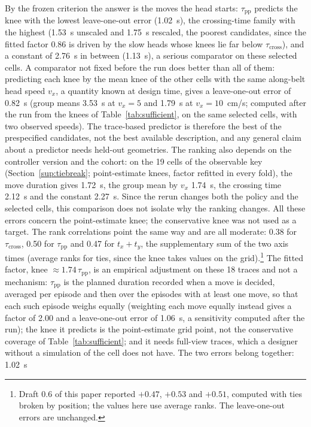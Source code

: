 \documentclass[11pt,a4paper]{article}
\newcommand{\tcross}{\tau_{\mathrm{cross}}}
\newcommand{\tpp}{\tau_{\mathrm{pp}}}
\begin{document}
By the frozen criterion the answer is the moves the head starts: $\tpp$ predicts the
knee with the lowest leave-one-out error (1.02~s), the crossing-time family with the
highest (1.53~s unscaled and 1.75~s rescaled, the poorest candidates, since the fitted
factor 0.86 is driven by the slow heads whose knees lie far below $\tcross$), and a
constant of 2.76~s in between (1.13~s), a serious comparator on these selected cells. A
comparator not fixed before the run does better than all of them: predicting each knee by
the mean knee of the other cells with the same along-belt head speed $v_x$, a quantity known
at design time, gives a leave-one-out error of 0.82~s (group means 3.53~s at $v_x=5$ and
1.79~s at $v_x=10$~cm/s; computed after the run from the knees of
Table~\ref{tab:sufficient}, on the same selected cells, with two observed speeds). The
trace-based predictor is therefore the best of the prespecified candidates, not the best
available description, and any general claim about a predictor needs held-out geometries.
The ranking also depends on the controller version and the cohort: on the 19 cells of the
observable key (Section~\ref{sup:tiebreak}; point-estimate knees, factor refitted in
every fold), the move duration gives 1.72~s, the group mean by $v_x$ 1.74~s, the crossing
time 2.12~s and the constant 2.27~s. Since the rerun changes both the policy and the
selected cells, this comparison does not isolate why the ranking changes. All these
errors concern the point-estimate knee; the conservative knee was not used as a target.
The rank correlations point the same way and are all moderate: 0.38 for $\tcross$, 0.50
for $\tpp$ and 0.47 for $t_x+t_y$, the supplementary sum of the two axis times (average
ranks for ties, since the knee takes values on the grid).\footnote{Draft 0.6 of this paper reported $+0.47$, $+0.53$ and $+0.51$, computed
with ties broken by position; the values here use average ranks. The leave-one-out errors
are unchanged.} The fitted factor, knee $\approx1.74\,\tpp$, is an empirical adjustment on
these 18 traces and not a mechanism: $\tpp$ is the planned duration recorded when a move
is decided, averaged per episode and then over the episodes with at least one move, so
that each such episode weighs equally (weighting each move equally instead gives a
factor of 2.00 and a leave-one-out error of 1.06~s, a sensitivity computed after the
run); the knee it predicts is the point-estimate grid point, not the conservative
coverage of Table~\ref{tab:sufficient}; and it needs full-view traces, which a designer
without a simulation of the cell does not have. The two errors belong together: 1.02~s
\end{document}
